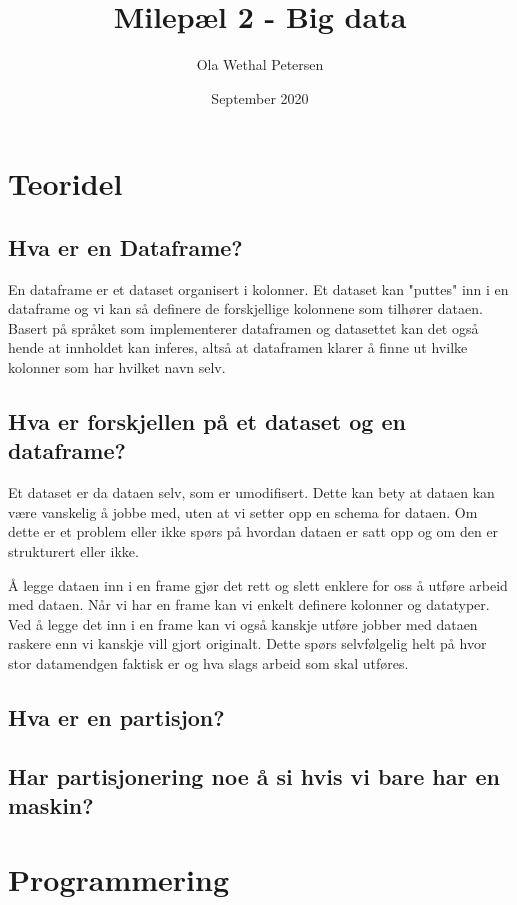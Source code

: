 \documentclass{article}
\begin{document}
    \title{Milepæl 2 - Big data}
    \author{Ola Wethal Petersen}
    \date{September 2020}
    \maketitle

    \clearpage 
    \section{Teoridel}
    \subsection*{Hva er en Dataframe?}
    En dataframe er et dataset organisert i kolonner. Et dataset kan "puttes" inn i en dataframe og vi kan så definere de forskjellige kolonnene som tilhører dataen.
    Basert på språket som implementerer dataframen og datasettet kan det også hende at innholdet kan inferes, altså at dataframen klarer å finne ut hvilke kolonner som har hvilket navn selv.
    \subsection*{Hva er forskjellen på et dataset og en dataframe?}
    Et dataset er da dataen selv, som er umodifisert. Dette kan bety at dataen kan være vanskelig å jobbe med, uten at vi setter opp en schema for dataen. Om dette er et problem eller ikke spørs på hvordan dataen er satt opp og om den er strukturert eller ikke. \newline

    \noindent Å legge dataen inn i en frame gjør det rett og slett enklere for oss å utføre arbeid med dataen. Når vi har en frame kan vi enkelt definere kolonner og datatyper. Ved å legge det inn i en frame kan vi også kanskje utføre jobber med dataen raskere enn vi kanskje vill gjort originalt. Dette spørs selvfølgelig helt på hvor stor datamendgen faktisk er og hva slags arbeid som skal utføres.

    \subsection*{Hva er en partisjon?}
    \subsection*{Har partisjonering noe å si hvis vi bare har en maskin?}
    \section{Programmering}
    
\end{document}
